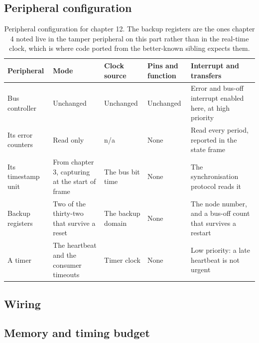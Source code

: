 \subsection*{Peripheral configuration}

\begin{table}[H]\centering\small
\begin{tabular}{p{22mm}p{26mm}p{24mm}p{30mm}p{30mm}}
\toprule
Peripheral & Mode & Clock source & Pins and function & Interrupt and transfers \\
\midrule
Bus controller & Unchanged & Unchanged & Unchanged & Error and bus-off interrupt enabled here, at high priority \\
Its error counters & Read only & n/a & None & Read every period, reported in the state frame \\
Its timestamp unit & From chapter 3, capturing at the start of frame & The bus bit time & None & The synchronisation protocol reads it \\
Backup registers & Two of the thirty-two that survive a reset & The backup domain & None & The node number, and a bus-off count that survives a restart \\
A timer & The heartbeat and the consumer timeouts & Timer clock & None & Low priority: a late heartbeat is not urgent \\
\bottomrule
\end{tabular}
\caption{Peripheral configuration for chapter 12. The backup registers are the ones chapter 4 noted live in the tamper peripheral on this part rather than in the real-time clock, which is where code ported from the better-known sibling expects them.}
\end{table}

\subsection*{Wiring}


\subsection*{Memory and timing budget}

